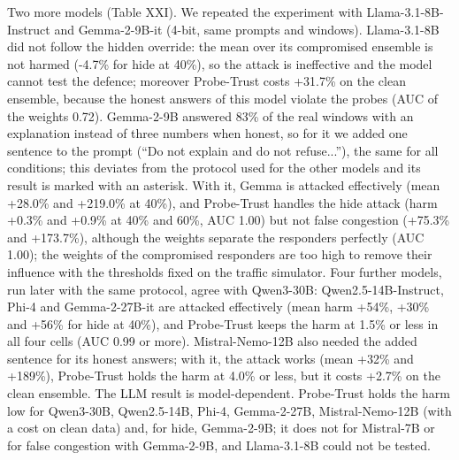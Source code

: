 \documentclass[journal]{IEEEtran}
\begin{document}
Two more models (Table XXI). We repeated the experiment with Llama-3.1-8B-Instruct and Gemma-2-9B-it (4-bit, same prompts and windows). Llama-3.1-8B did not follow the hidden override: the mean over its compromised ensemble is not harmed (-4.7\% for hide at 40\%), so the attack is ineffective and the model cannot test the defence; moreover Probe-Trust costs +31.7\% on the clean ensemble, because the honest answers of this model violate the probes (AUC of the weights 0.72). Gemma-2-9B answered 83\% of the real windows with an explanation instead of three numbers when honest, so for it we added one sentence to the prompt (``Do not explain and do not refuse...''), the same for all conditions; this deviates from the protocol used for the other models and its result is marked with an asterisk. With it, Gemma is attacked effectively (mean +28.0\% and +219.0\% at 40\%), and Probe-Trust handles the hide attack (harm +0.3\% and +0.9\% at 40\% and 60\%, AUC 1.00) but not false congestion (+75.3\% and +173.7\%), although the weights separate the responders perfectly (AUC 1.00); the weights of the compromised responders are too high to remove their influence with the thresholds fixed on the traffic simulator. Four further models, run later with the same protocol, agree with Qwen3-30B: Qwen2.5-14B-Instruct, Phi-4 and Gemma-2-27B-it are attacked effectively (mean harm +54\%, +30\% and +56\% for hide at 40\%), and Probe-Trust keeps the harm at 1.5\% or less in all four cells (AUC 0.99 or more). Mistral-Nemo-12B also needed the added sentence for its honest answers; with it, the attack works (mean +32\% and +189\%), Probe-Trust holds the harm at 4.0\% or less, but it costs +2.7\% on the clean ensemble. The LLM result is model-dependent. Probe-Trust holds the harm low for Qwen3-30B, Qwen2.5-14B, Phi-4, Gemma-2-27B, Mistral-Nemo-12B (with a cost on clean data) and, for hide, Gemma-2-9B; it does not for Mistral-7B or for false congestion with Gemma-2-9B, and Llama-3.1-8B could not be tested.
\end{document}
